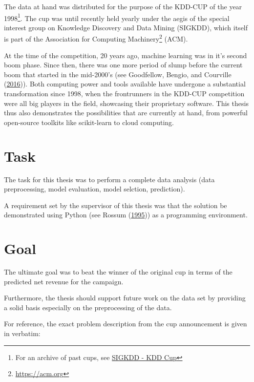 \documentclass[
  11pt,
  a4paper,
  DIV=12,captions=tableheading,oneside]{scrbook}
\begin{document}
The data at hand was distributed for the purpose of the KDD-CUP of the year 1998\footnote{For an archive of past cups, see \href{http://www.kdd.org/kdd-cup}{SIGKDD - KDD Cup}}. The cup was until recently held yearly under the aegis of the special interest group on Knowledge Discovery and Data Mining (SIGKDD), which itself is part of the Association for Computing Machinery\footnote{\url{https://acm.org}} (ACM).

At the time of the competition, 20 years ago, machine learning was in it's second boom phase. Since then, there was one more period of slump before the current boom that started in the mid-2000's (see Goodfellow, Bengio, and Courville (\protect\hyperlink{ref-Goodfellow-et-al-2016}{2016})). Both computing power and tools available have undergone a substantial transformation since 1998, when the frontrunners in the KDD-CUP competition were all big players in the field, showcasing their proprietary software. This thesis thus also demonstrates the possibilities that are currently at hand, from powerful open-source toolkits like scikit-learn to cloud computing.

\hypertarget{task}{%
\section{Task}\label{task}}

The task for this thesis was to perform a complete data analysis (data preprocessing, model evaluation, model selction, prediction).

A requirement set by the supervisor of this thesis was that the solution be demonstrated using Python (see Rossum (\protect\hyperlink{ref-CS-R9526}{1995})) as a programming environment.

\hypertarget{goal}{%
\section{Goal}\label{goal}}

The ultimate goal was to beat the winner of the original cup in terms of the predicted net revenue for the campaign.

Furthermore, the thesis should support future work on the data set by providing a solid basis especially on the preprocessing of the data.

For reference, the exact problem description from the cup announcement is given in verbatim:
\end{document}
